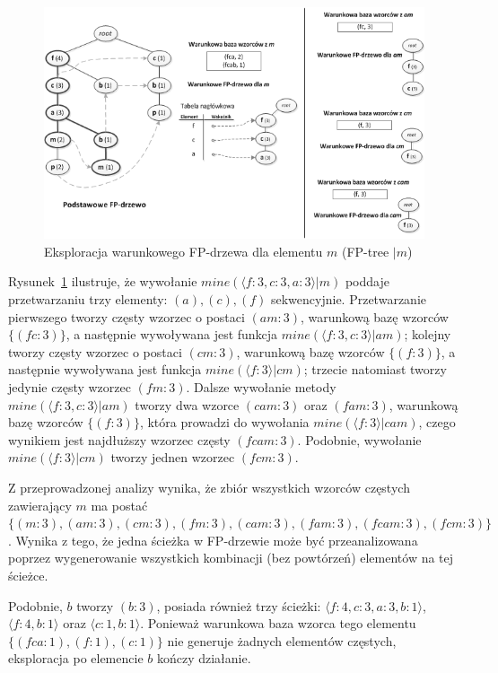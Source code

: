 \begin{figure}[ht]
\centering\includegraphics{figures/02/mining_fptree.png}
\caption{Eksploracja warunkowego FP-drzewa dla elementu $m$ (FP-tree $| m$)~\cite{Main:FPgrowth}}\label{rys:mining_fptree}
\end{figure}

Rysunek~\ref{rys:mining_fptree} ilustruje, że wywołanie $mine(\langle f: 3, c: 3, a: 3 \rangle | m)$ poddaje przetwarzaniu trzy elementy: $(a), (c), (f)$ sekwencyjnie. Przetwarzanie pierwszego tworzy częsty wzorzec o postaci $(am: 3)$, warunkową bazę wzorców $\lbrace (fc: 3) \rbrace$, a następnie wywoływana jest funkcja $mine(\langle f: 3, c: 3 \rangle | am)$; kolejny tworzy częsty wzorzec o postaci $(cm: 3)$, warunkową bazę wzorców $\lbrace (f: 3)\rbrace$, a następnie wywoływana jest funkcja $mine(\langle f: 3 \rangle | cm)$; trzecie natomiast tworzy jedynie częsty wzorzec $(fm: 3)$. Dalsze wywołanie metody $mine(\langle f: 3, c: 3 \rangle | am)$ tworzy dwa wzorce $(cam: 3)$ oraz $(fam: 3)$, warunkową bazę wzorców $\lbrace ( f: 3 ) \rbrace$, która prowadzi do wywołania $mine(\langle f: 3 \rangle | cam)$, czego wynikiem jest najdłuższy wzorzec częsty $(fcam: 3)$. Podobnie, wywołanie $mine(\langle f: 3 \rangle | cm)$ tworzy jednen wzorzec $(fcm: 3)$. 

Z przeprowadzonej analizy wynika, że zbiór wszystkich wzorców częstych zawierający $m$ ma postać $\lbrace (m: 3), (am: 3), (cm: 3), (fm: 3), (cam: 3), (fam: 3), (fcam: 3), (fcm: 3) \rbrace$. Wynika z tego, że jedna ścieżka w FP-drzewie może być przeanalizowana poprzez wygenerowanie wszystkich kombinacji (bez powtórzeń) elementów na tej ścieżce.

Podobnie, $b$ tworzy $(b: 3)$, posiada również trzy ścieżki: $\langle f:4, c:3, a:3, b:1 \rangle$, $\langle f:4, b:1 \rangle$ oraz $\langle c:1, b:1 \rangle$. Ponieważ warunkowa baza wzorca tego elementu $\lbrace (fca:1), (f:1), (c:1)\rbrace$ nie generuje żadnych elementów częstych, eksploracja po elemencie $b$ kończy działanie. 

